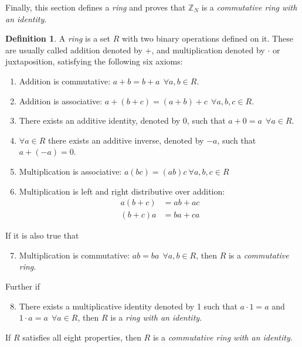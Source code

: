 \documentclass[english]{article}
\def\zzzn{\mathbb{Z}_N}
\theoremstyle{plain}
\theoremstyle{definition}
\newtheorem{definition}[theorem]{Definition}%
\theoremstyle{remark}
\begin{document}
\par Finally, this section defines a {\em ring} and proves that $\zzzn$ is a
{\em commutative ring with an identity}.
\begin{definition}
\label{def:ring}
  A {\em ring} is a set $R$ with two binary operations defined on it. These are usually
  called addition denoted by +, and multiplication denoted by $\cdot$ or juxtaposition,
  satisfying the following six axioms:
  \begin{enumerate}
    \item Addition is commutative: $a+b=b+a \ \ \forall a,b \in R$.
    \item Addition is associative: $a+(b+c)=(a+b)+c \ \ \forall a,b,c \in R$.
    \item There exists an additive identity, denoted by 0, such that $a+0=a \ \ \forall a \in R$.
    \item $\forall a \in R$ there exists an additive inverse, denoted by $-a$, such
      that $a+(-a)=0$.
    \item Multiplication is associative: $a(bc)=(ab)c \ \forall a,b,c \in R$
    \item Multiplication is left and right distributive over addition:
      \begin{align*}
        a(b+c)&=ab+ac \\
        (b+c)a&=ba+ca
      \end{align*}
  \end{enumerate}
  If it is also true that
  \begin{enumerate}
      \setcounter{enumi}{6}
    \item Multiplication is commutative: $ab=ba \ \ \forall a,b \in R$, then
      $R$ is a {\em commutative ring}.
  \end{enumerate}
  Further if
  \begin{enumerate}
      \setcounter{enumi}{7}
    \item There exists a multiplicative identity denoted by 1 such that
      $a \cdot 1=a$ and $1 \cdot a=a \ \ \forall a \in R$, then $R$ is a
      {\em ring with an identity}.
  \end{enumerate}
  If $R$ satisfies all eight properties, then $R$ is a {\em commutative ring with
  an identity.}
\end{definition}
\end{document}
